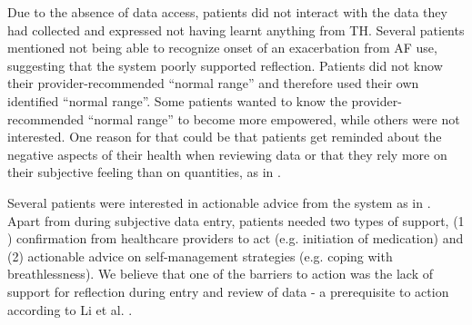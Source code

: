 Due to the absence of data access, patients did not interact with the data they had collected and expressed not having learnt anything from TH. Several patients mentioned not being able to recognize onset of an exacerbation from AF use, suggesting that the system poorly supported reflection. Patients did not know their provider-recommended “normal range” and therefore used their own identified “normal range”. Some patients wanted to know the provider-recommended “normal range” to become more empowered, while others were not interested. One reason for that could be that patients get reminded about the negative aspects of their health when reviewing data or that they rely more on their subjective feeling than on quantities, as in \cite{Ancker2015}. 

Several patients were interested in actionable advice from the system as in \cite{Chung2015, Li2010}. Apart from during subjective data entry, patients needed two types of support, (1 ) confirmation from healthcare providers to act (e.g. initiation of medication) and (2) actionable advice on self-management strategies (e.g. coping with breathlessness). We believe that one of the barriers to action was the lack of support for reflection during entry and review of data  - a prerequisite to action according to Li et al. \cite{Li2010}.
